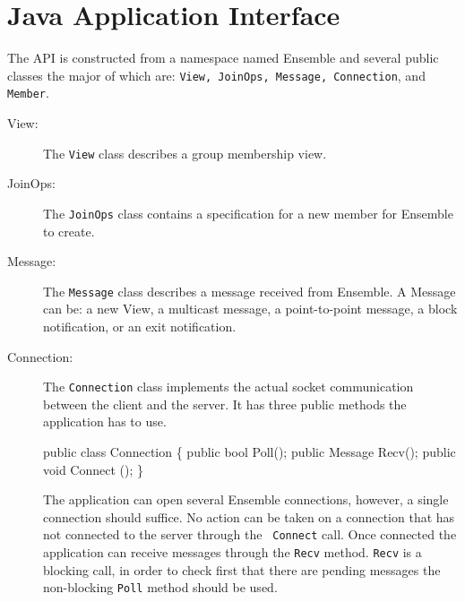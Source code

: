 \section{Java Application Interface}


The API is constructed from a namespace named Ensemble and several
public classes the major of which are: {\tt View, JoinOps, Message,
  Connection}, and {\tt Member}. 

\begin{description}
\item[View:] The {\tt View} class describes a group membership view. 

\item[JoinOps:] The {\tt JoinOps} class contains a
  specification for a new member for Ensemble to create. 

\item[Message:] The {\tt Message} class describes a message received
  from Ensemble. A Message can be: a new View, a multicast message, a
  point-to-point message, a block notification, or an exit notification. 

\item[Connection:] The {\tt Connection} class implements the actual
  socket communication between the client and the server. It has three
  public methods the application has to use.

  \begin{codebox}
   public class Connection \{
       public bool Poll();	  
       public Message Recv();
       public void Connect ();
  \}
  \end{codebox}

  The application can open several Ensemble connections, however, a
  single connection should suffice. No action can be taken on a
  connection that has not connected to the server through the {\tt
  Connect} call. Once connected the application can receive messages
  through the {\tt Recv} method. {\tt Recv} is a blocking call, in
  order to check first that there are pending messages the
  non-blocking {\tt Poll} method should be used. 
  


\end{description}
